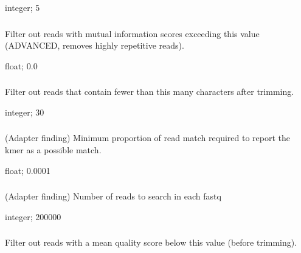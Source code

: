 \documentclass[letterpaper,11pt,english]{sphinxmanual}
\begin{document}
 integer;  5


\subsubsection{}
\label{\detokenize{prog_desc:i-filter-low-info}}
 Filter out reads with mutual information scores exceeding this value (ADVANCED, removes highly repetitive reads).

 float;  0.0


\subsubsection{}
\label{\detokenize{prog_desc:l-filter-length}}
 Filter out reads that contain fewer than this many characters after trimming.

 integer;  30


\subsubsection{}
\label{\detokenize{prog_desc:m-adapter-min-match}}
 (Adapter finding) Minimum proportion of read match required to report the kmer as a possible match.

 float;  0.0001


\subsubsection{}
\label{\detokenize{prog_desc:n-adapter-number-of-reads}}
 (Adapter finding) Number of reads to search in each fastq

 integer;  200000


\subsubsection{}
\label{\detokenize{prog_desc:q-filter-quality}}
 Filter out reads with a mean quality score below this value (before trimming).
\end{document}
